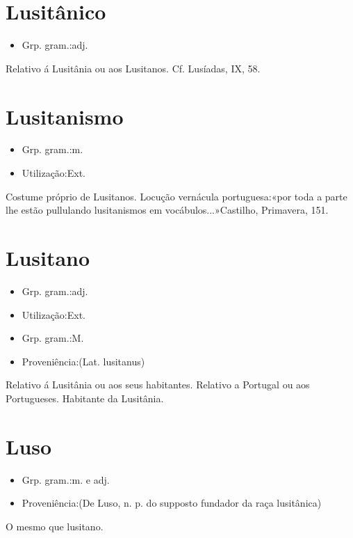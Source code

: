 \section{Lusitânico}
\begin{itemize}
\item {Grp. gram.:adj.}
\end{itemize}
Relativo á Lusitânia ou aos Lusitanos. Cf. \textunderscore Lusíadas\textunderscore , IX, 58.
\section{Lusitanismo}
\begin{itemize}
\item {Grp. gram.:m.}
\end{itemize}
\begin{itemize}
\item {Utilização:Ext.}
\end{itemize}
Costume próprio de Lusitanos.
Locução vernácula portuguesa:«\textunderscore por toda a parte lhe estão pullulando lusitanismos em vocábulos...\textunderscore »Castilho, \textunderscore Primavera\textunderscore , 151.
\section{Lusitano}
\begin{itemize}
\item {Grp. gram.:adj.}
\end{itemize}
\begin{itemize}
\item {Utilização:Ext.}
\end{itemize}
\begin{itemize}
\item {Grp. gram.:M.}
\end{itemize}
\begin{itemize}
\item {Proveniência:(Lat. \textunderscore lusitanus\textunderscore )}
\end{itemize}
Relativo á Lusitânia ou aos seus habitantes.
Relativo a Portugal ou aos Portugueses.
Habitante da Lusitânia.
\section{Luso}
\begin{itemize}
\item {Grp. gram.:m.  e  adj.}
\end{itemize}
\begin{itemize}
\item {Proveniência:(De \textunderscore Luso\textunderscore , n. p. do supposto fundador da raça lusitânica)}
\end{itemize}
O mesmo que \textunderscore lusitano\textunderscore .
